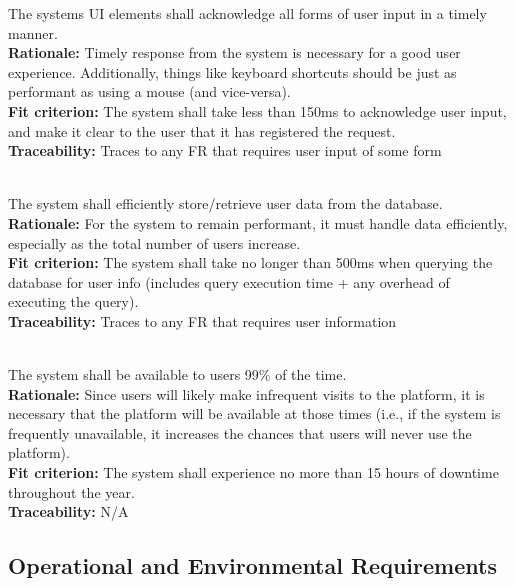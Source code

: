 \documentclass[12pt, titlepage]{article}
\newcounter{NFR_Counter}
\newcounter{FR_Counter}
\begin{document}
The systems UI elements shall acknowledge all forms of user input in a timely manner.\\
\textbf{Rationale:}
Timely response from the system is necessary for a good user experience. Additionally, things like keyboard
shortcuts should be just as performant as using a mouse (and vice-versa).\\
\textbf{Fit criterion:}
The system shall take less than 150ms to acknowledge user input, and make it clear to the user that it has registered the request.\\
\textbf{Traceability:}
Traces to any FR that requires user input of some form \\~\\
\addtocounter{NFR_Counter}{1}


The system shall efficiently store/retrieve user data from the database.\\
\textbf{Rationale:}
For the system to remain performant, it must handle data efficiently, especially as the total number of users increase.\\
\textbf{Fit criterion:}
The system shall take no longer than 500ms when querying the database for user info (includes query execution time + any overhead of executing 
the query).\\
\textbf{Traceability:}
Traces to any FR that requires user information \\~\\
\addtocounter{NFR_Counter}{1}

The system shall be available to users 99\% of the time.\\
\textbf{Rationale:}
Since users will likely make infrequent visits to the platform, it is necessary that the platform will be available at those 
times (i.e., if the system is frequently unavailable, it increases the chances that users will never use the platform).\\
\textbf{Fit criterion:}
The system shall experience no more than 15 hours of downtime throughout the year.\\
\textbf{Traceability:}
N/A
\addtocounter{NFR_Counter}{1}

\subsection{Operational and Environmental Requirements}
\end{document}
